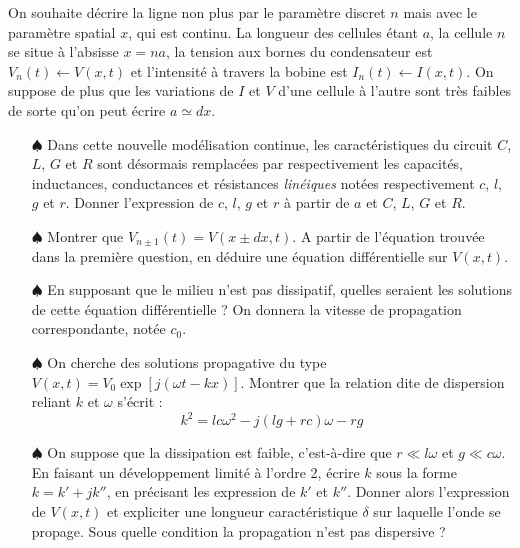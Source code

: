 \documentclass{report}
\begin{document}
On souhaite décrire la ligne non plus par le paramètre discret $n$ mais avec le paramètre spatial $x$, qui est continu. La longueur des cellules étant $a$, la cellule $n$ se situe à l'absisse $x=na$, la tension aux bornes du condensateur est $V_n(t)\leftarrow V(x,t)$ et l'intensité à travers la bobine est $I_n(t)\leftarrow I(x,t)$. On suppose de plus que les variations de $I$ et $V$ d'une cellule à l'autre sont très faibles de sorte qu'on peut écrire $a\simeq dx$.

\begin{itemize}

	\item[$\spadesuit$] Dans cette nouvelle modélisation continue, les caractéristiques du circuit $C$, $L$, $G$ et $R$ sont désormais remplacées par respectivement les capacités, inductances, conductances et résistances \textit{linéiques} notées respectivement $c$, $l$, $g$ et $r$. Donner l'expression de $c$, $l$, $g$ et $r$ à partir de $a$ et $C$, $L$, $G$ et $R$.

	\item[$\spadesuit$] Montrer que $V_{n\pm1}(t)=V(x\pm dx,t)$. A partir de l'équation trouvée dans la première question, en déduire une équation différentielle sur $V(x,t)$.

	\item[$\spadesuit$] En supposant que le milieu n'est pas dissipatif, quelles seraient les solutions de cette équation différentielle ? On donnera la vitesse de propagation correspondante, notée $c_0$.
	
	\item[$\spadesuit$] On cherche des solutions propagative du type $V(x,t)=V_0\exp\left[j(\omega t - kx )\right]$. Montrer que la relation dite de dispersion reliant $k$ et $\omega$ s'écrit :
	\begin{equation}
		k^2=lc\omega^2-j(lg+rc)\omega-rg
	\end{equation}

 \item[$\spadesuit$] On suppose que la dissipation est faible, c'est-à-dire que $r\ll l\omega$ et $g\ll c\omega$. En faisant un développement limité à l'ordre 2, écrire $k$ sous la forme $k=k'+jk''$, en précisant les expression de $k'$ et $k''$. Donner alors l'expression de $V(x,t)$ et expliciter une longueur caractéristique $\delta$ sur laquelle l'onde se propage. Sous quelle condition la propagation n'est pas dispersive ?

\end{itemize}
\end{document}
